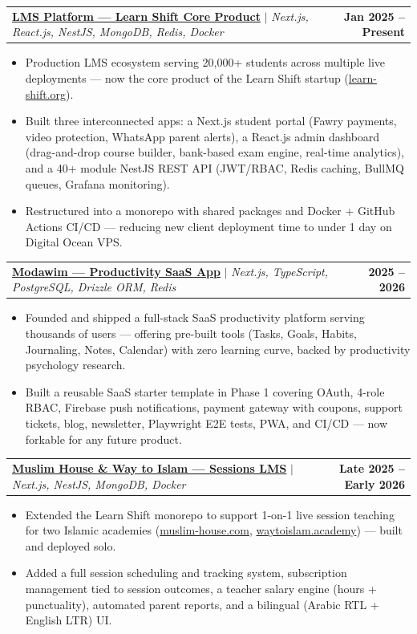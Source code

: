 \documentclass[letterpaper,11pt]{article}
\makeatletter
\newcommand{\resumeItem}[1]{
  \item\small{
    {#1 \vspace{-2pt}}
  }
}
\newcommand{\resumeProjectHeading}[2]{
    \item
    \begin{tabular*}{1.001\textwidth}{l@{\extracolsep{\fill}}r}
      \small#1 & \textbf{\small #2}\\
    \end{tabular*}\vspace{-7pt}
}
\newcommand{\resumeItemListStart}{\begin{itemize}}
\newcommand{\resumeItemListEnd}{\end{itemize}\vspace{-5pt}}
\makeatother
\begin{document}
\resumeProjectHeading
  {\href{https://heba-elsayed.com}{\underline{\textbf{LMS Platform — Learn Shift Core Product}}} $|$ \emph{Next.js, React.js, NestJS, MongoDB, Redis, Docker}}{Jan 2025 -- Present}
  \resumeItemListStart
    \resumeItem{Production LMS ecosystem serving 20,000+ students across multiple live deployments — now the core product of the Learn Shift startup (\href{https://learn-shift.org}{learn-shift.org}).}
    \resumeItem{Built three interconnected apps: a Next.js student portal (Fawry payments, video protection, WhatsApp parent alerts), a React.js admin dashboard (drag-and-drop course builder, bank-based exam engine, real-time analytics), and a 40+ module NestJS REST API (JWT/RBAC, Redis caching, BullMQ queues, Grafana monitoring).}
    \resumeItem{Restructured into a monorepo with shared packages and Docker + GitHub Actions CI/CD — reducing new client deployment time to under 1 day on Digital Ocean VPS.}
  \resumeItemListEnd
  \vspace{-13pt}

\resumeProjectHeading
  {\href{https://modawim.com}{\underline{\textbf{Modawim — Productivity SaaS App}}} $|$ \emph{Next.js, TypeScript, PostgreSQL, Drizzle ORM, Redis}}{2025 -- 2026}
  \resumeItemListStart
    \resumeItem{Founded and shipped a full-stack SaaS productivity platform serving thousands of users — offering pre-built tools (Tasks, Goals, Habits, Journaling, Notes, Calendar) with zero learning curve, backed by productivity psychology research.}
    \resumeItem{Built a reusable SaaS starter template in Phase 1 covering OAuth, 4-role RBAC, Firebase push notifications, payment gateway with coupons, support tickets, blog, newsletter, Playwright E2E tests, PWA, and CI/CD — now forkable for any future product.}
  \resumeItemListEnd
  \vspace{-13pt}

\resumeProjectHeading
  {\href{https://muslim-house.com}{\underline{\textbf{Muslim House \& Way to Islam — Sessions LMS}}} $|$ \emph{Next.js, NestJS, MongoDB, Docker}}{Late 2025 -- Early 2026}
  \resumeItemListStart
    \resumeItem{Extended the Learn Shift monorepo to support 1-on-1 live session teaching for two Islamic academies (\href{https://muslim-house.com}{muslim-house.com}, \href{https://waytoislam.academy}{waytoislam.academy}) — built and deployed solo.}
    \resumeItem{Added a full session scheduling and tracking system, subscription management tied to session outcomes, a teacher salary engine (hours + punctuality), automated parent reports, and a bilingual (Arabic RTL + English LTR) UI.}
  \resumeItemListEnd
  \vspace{-13pt}
\end{document}
